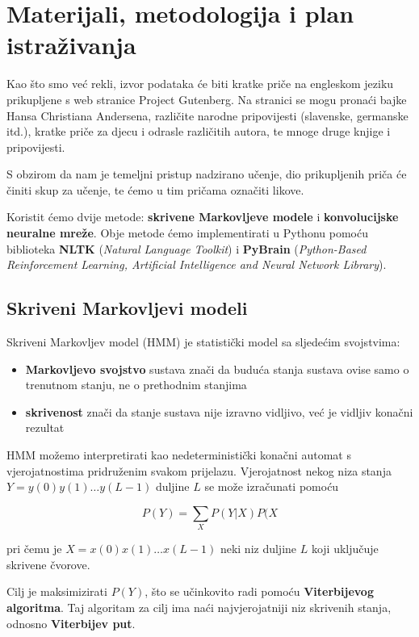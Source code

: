 \documentclass[]{article}
\begin{document}
	\section{Materijali, metodologija i plan istraživanja}
	
	Kao što smo već rekli, izvor podataka će biti kratke priče na engleskom jeziku prikupljene s web stranice Project Gutenberg. Na stranici se mogu pronaći bajke Hansa Christiana Andersena, različite narodne pripovijesti (slavenske, germanske itd.), kratke priče za djecu i odrasle različitih autora, te mnoge druge knjige i pripovijesti.
	
	S obzirom da nam je temeljni pristup nadzirano učenje, dio prikupljenih priča će činiti skup za učenje, te ćemo u tim pričama označiti likove.
	
	Koristit ćemo dvije metode: \textbf{skrivene Markovljeve modele} i \textbf{konvolucijske neuralne mreže}. Obje metode ćemo implementirati u Pythonu pomoću biblioteka \textbf{NLTK} (\textit{Natural Language Toolkit}) i \textbf{PyBrain} (\textit{Python-Based Reinforcement Learning, Artificial Intelligence and Neural Network Library}).
	
	\subsection{Skriveni Markovljevi modeli}
	
	Skriveni Markovljev model (HMM) je statistički model sa sljedećim svojstvima:
	\begin{itemize}
		\item \textbf{Markovljevo svojstvo} sustava znači da buduća stanja sustava ovise samo o trenutnom stanju, ne o prethodnim stanjima
		\item \textbf{skrivenost} znači da stanje sustava nije izravno vidljivo, već je vidljiv konačni rezultat
	\end{itemize} 
	
	HMM možemo interpretirati kao nedeterministički konačni automat s vjerojatnostima pridruženim svakom prijelazu. Vjerojatnost nekog niza stanja $Y = y(0) y(1) \ldots y(L-1)$ duljine $L$ se može izračunati pomoću
	
	\begin{equation*}
		P(Y) = \sum_{X} P(Y|X) P(X
	\end{equation*}
	
	pri čemu je $X = x(0) x(1) \ldots x(L-1)$ neki niz duljine $L$ koji uključuje skrivene čvorove.
	
	Cilj je maksimizirati $P(Y)$, što se učinkovito radi pomoću \textbf{Viterbijevog algoritma}. Taj algoritam za cilj ima naći najvjerojatniji niz skrivenih stanja, odnosno \textbf{Viterbijev put}.
	
\end{document}
